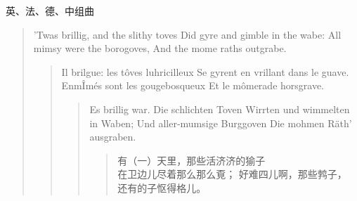 \begin{dialog}{英、法、德、中组曲}
\begin{verse}
'Twas brillig, and the slithy toves
Did gyre and gimble in the wabe:
All mimsy were the borogoves,
And the mome raths outgrabe.

  \begin{verse}
  Il brilgue: les tôves luhricilleux
  Se gyrent en vrillant dans le guave.
  EnmÎmés sont les gougebosqueux
  Et le mômerade horsgrave.

    \begin{verse}
    Es brillig war. Die schlichten Toven
    Wirrten und wimmelten in Waben;
    Und aller-mumsige Burggoven
    Die mohmen Räth' ausgraben.

      \begin{verse}
      有（一）天里，那些活济济的㺄子\\
      在卫边儿尽着那么那么覔；
      好难四儿啊，那些鹁子，\\
      还有的子怄得格儿。
      \end{verse}
    \end{verse}
  \end{verse}

\end{verse}

\end{dialog}
